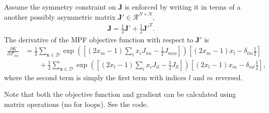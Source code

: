 \documentclass{article}
\newcommand{\pd}[2]{\frac{\partial #1}{\partial #2}}
\newcommand{\mb}{\mathbf}
\begin{document}
Assume the symmetry constraint on $\mb J$ is enforced by writing it in terms of a another possibly asymmetric matrix $\mb J' \in \mathcal R^{N\times N}$,
\begin{align}
\mb J = \frac{1}{2} \mb J' + \frac{1}{2} \mb {J'}^T
.
\end{align}
The derivative of the MPF objective function with respect to $\mb J'$ is
\begin{align}
\pd{K}{{J'}_{lm}}  & =
\frac{1}{2}\sum_{\mb x \in \mathcal D} \exp\left( \left[
\left( 2 x_m - 1 \right) \sum_i x_i {J}_{im}
-
\frac{1}{2}{J}_{mm}
\right]
\right)
	\left[
		\left( 2 x_m - 1 \right) x_l
		-
		\delta_{lm} \frac{1}{2}
	\right] \nonumber \\ & \qquad 
+
\frac{1}{2}\sum_{\mb x \in \mathcal D} \exp\left( \left[
\left( 2 x_l - 1 \right) \sum_i x_i {J}_{il}
-
\frac{1}{2}{J}_{ll}
\right]
\right)
	\left[
		\left( 2 x_l - 1 \right) x_m
		-
		\delta_{ml} \frac{1}{2}
	\right]
,
\end{align}
where the second term is simply the first term with indices $l$ and $m$ reversed.

Note that both the objective function and gradient can be calculated using matrix operations (no for loops).  See the code.
		
\end{document}
